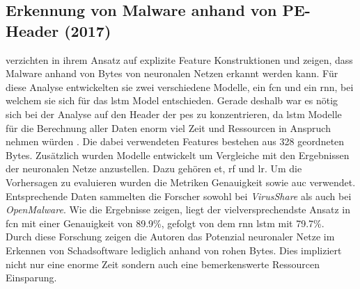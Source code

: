 \documentclass[
    12pt, %
    DIV10,
    ngerman, %
    a4paper, %
    oneside, %
    titlepage, %
    parskip=half, %
    headings=normal, %
    listof=totoc, %
    bibliography=totoc, %
    index=totoc, %
    captions=tableheading, %
    final %
]{scrreprt}
\begin{document}
\subsection{Erkennung von Malware anhand von PE-Header (2017)}
\textcite{Raff2017} verzichten in ihrem Ansatz auf explizite Feature Konstruktionen und zeigen, dass Malware anhand von Bytes von neuronalen Netzen erkannt werden kann. 
Für diese Analyse entwickelten sie zwei verschiedene Modelle, ein \ac{fcn} und ein \ac{rnn}, bei welchem sie sich für das \ac{lstm} Model entschieden. Gerade deshalb war es nötig sich bei der Analyse auf den Header der \ac{pes} zu konzentrieren, da \ac{lstm} Modelle für die Berechnung aller Daten enorm viel Zeit und Ressourcen in Anspruch nehmen würden \parencite{Raff2017}. Die dabei verwendeten Features bestehen aus 328 geordneten Bytes.
Zusätzlich wurden Modelle entwickelt um Vergleiche mit den Ergebnissen der neuronalen Netze anzustellen. Dazu gehören \ac{et}, \ac{rf} und \ac{lr}. Um die Vorhersagen zu evaluieren wurden die Metriken Genauigkeit sowie \ac{auc} verwendet. Entsprechende Daten sammelten die Forscher sowohl bei \emph{VirusShare} als auch bei \emph{OpenMalware}. Wie die Ergebnisse zeigen, liegt der vielversprechendste Ansatz in \ac{fcn} mit einer Genauigkeit von 89.9\%, gefolgt von dem \ac{rnn} \ac{lstm} mit 79.7\%.\\
Durch diese Forschung zeigen die Autoren das Potenzial neuronaler Netze im Erkennen von Schadsoftware lediglich anhand von rohen Bytes. Dies impliziert nicht nur eine enorme Zeit sondern auch eine bemerkenswerte Ressourcen Einsparung.
%
\end{document}
